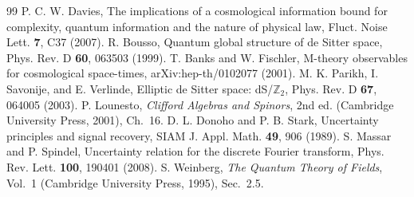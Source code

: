 \documentclass[aps,prd,twocolumn,superscriptaddress,nofootinbib]{revtex4-2}
\begin{document}
\begin{thebibliography}{99}
 P. C. W. Davies, The implications of a cosmological information bound for complexity, quantum information and the nature of physical law, Fluct. Noise Lett. \textbf{7}, C37 (2007).
 R. Bousso, Quantum global structure of de Sitter space, Phys. Rev. D \textbf{60}, 063503 (1999).
 T. Banks and W. Fischler, M-theory observables for cosmological space-times, arXiv:hep-th/0102077 (2001).
 M. K. Parikh, I. Savonije, and E. Verlinde, Elliptic de Sitter space: dS/$\mathbb{Z}_2$, Phys. Rev. D \textbf{67}, 064005 (2003).
 P. Lounesto, \emph{Clifford Algebras and Spinors}, 2nd ed. (Cambridge University Press, 2001), Ch.~16.
 D. L. Donoho and P. B. Stark, Uncertainty principles and signal recovery, SIAM J. Appl. Math. \textbf{49}, 906 (1989).
 S. Massar and P. Spindel, Uncertainty relation for the discrete Fourier transform, Phys. Rev. Lett. \textbf{100}, 190401 (2008).
 S. Weinberg, \emph{The Quantum Theory of Fields}, Vol.~1 (Cambridge University Press, 1995), Sec.~2.5.
\end{thebibliography}
\end{document}
